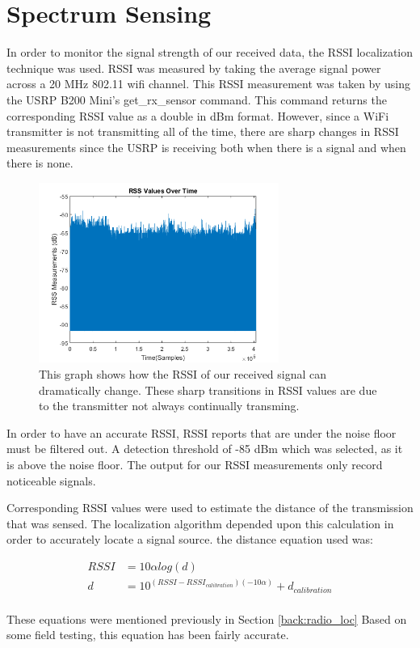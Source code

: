\section{Spectrum Sensing}

In order to monitor the signal strength of our received data, the RSSI localization technique was used. RSSI was measured by taking the average signal power across a 20 MHz 802.11 wifi channel. This RSSI measurement was taken by using the USRP B200 Mini’s get\_rx\_sensor command.  This command returns the corresponding RSSI value as a double in dBm format.  However, since a WiFi transmitter is not transmitting all of the time, there are sharp changes in RSSI measurements since the USRP is receiving both when there is a signal and when there is none.

\begin{figure}[h]
	\centering
	\includegraphics[width=0.70\textwidth]{img/rss_vals_test.png}
	\caption{This graph shows how the RSSI of our received signal can dramatically change.  These sharp transitions in RSSI values are due to the transmitter not always continually transming.}
	\label{fig:rss_values}
\end{figure}
In order to have an accurate RSSI, RSSI reports that are under the noise floor must be filtered out. A detection threshold of -85 dBm which was selected, as it is above the noise floor.  The output for our RSSI measurements only record noticeable signals.  

Corresponding RSSI values were used to estimate the distance of the transmission that was sensed.  The localization algorithm depended upon this calculation in order to accurately locate a signal source. the distance equation used was:

 \begin{align}
\label{eq:rss} RSSI &= 10\alpha log(d) \\ 
d &= 10^{(RSSI-RSSI_{calibration})(-10\alpha)} + d_{calibration} \label{eq:rss_dist}
\end{align}\\
These equations were mentioned previously in Section \ref{back:radio_loc}
Based on some field testing, this equation has been fairly accurate.\par

